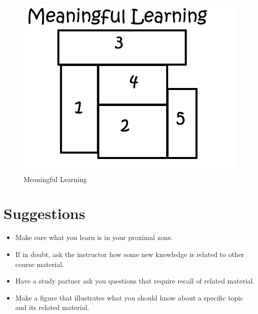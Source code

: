 \begin{figure}
	\centering
	\includegraphics[width=0.55\linewidth]{./images/mean2}
	\caption{Meaningful Learning}
	\label{fig:mean2}
\end{figure}

\section{Suggestions}

\begin{itemize}
	\item Make sure what you learn is in your proximal zone.
	\item If in doubt, ask the instructor how some new knowledge is related to other course material.
	\item Have a study partner ask you questions that require recall of related material.
	\item Make a figure that illustrates what you should know about a specific topic and its related material.
\end{itemize}